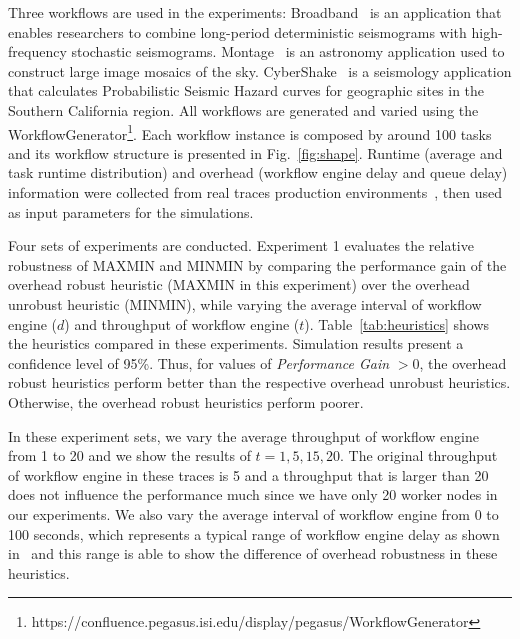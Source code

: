 Three workflows are used in the experiments: 
Broadband~\cite{Broadband} is an application that enables researchers to combine long-period deterministic seismograms with high-frequency stochastic seismograms. 
Montage~\cite{Sakellariou2010} is an astronomy application used to construct large image mosaics of the sky. CyberShake~\cite{Callaghan2008} is a seismology application that calculates Probabilistic Seismic Hazard curves for geographic sites in the Southern California region. All workflows are generated and varied using the WorkflowGenerator\footnote[1]{https://confluence.pegasus.isi.edu/display/pegasus/WorkflowGenerator}. Each workflow instance is composed by around 100 tasks and its workflow structure is presented in Fig.~\ref{fig:shape}. Runtime (average and task runtime distribution) and overhead (workflow engine delay and queue delay) information were collected from real traces production environments~\cite{Chen2011, Juve2013}, then used as input parameters for the simulations.




Four sets of experiments are conducted. Experiment 1 evaluates the relative robustness of MAXMIN and MINMIN by comparing the performance gain of the overhead robust heuristic (MAXMIN in this experiment) over the overhead unrobust heuristic (MINMIN), while varying the average interval of workflow engine ($d$) and throughput of workflow engine ($t$). Table~\ref{tab:heuristics} shows the heuristics compared in these experiments. Simulation results present a confidence level of 95\%. Thus, for values of \emph{Performance Gain} $> 0$, the overhead robust heuristics perform better than the respective overhead unrobust heuristics. Otherwise, the overhead robust heuristics perform poorer.




In these experiment sets, we vary the average throughput of workflow engine from 1 to 20 and we show the results of $t=1, 5, 15, 20$. The original throughput of workflow engine in these traces is 5 and a throughput that is larger than 20 does not influence the performance much since we have only 20 worker nodes in our experiments. We also vary the average interval of workflow engine from 0 to 100 seconds, which represents a typical range of workflow engine delay as shown in~\cite{Chen2011} and this range is able to show the difference of overhead robustness in these heuristics. 

